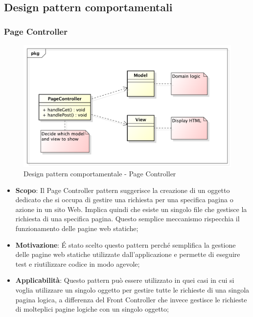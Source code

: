 
	\clearpage 
	\newpage
	\subsection{Design pattern comportamentali} %
		\subsubsection{Page Controller} %
		\begin{figure}[htbp]
			\centering
			\centerline{\includegraphics[scale=0.5]{./images/designpatternappendice/page_controller.pdf}}
			\caption{Design pattern comportamentale - Page Controller}
		\end{figure}

		\begin{itemize}
			\item \textbf{Scopo}: Il Page Controller pattern suggerisce la creazione di un oggetto dedicato che si occupa di gestire una richiesta per una specifica pagina o azione in un sito Web. Implica quindi che esiste un singolo file che gestisce la richiesta di una specifica pagina. Questo semplice meccanismo rispecchia il funzionamento delle pagine web statiche;
			\item \textbf{Motivazione}: \'E stato scelto questo pattern perché semplifica la gestione delle pagine web statiche utilizzate dall'applicazione e permette di eseguire test e riutilizzare codice in modo agevole;
			\item \textbf{Applicabilità}: Questo pattern può essere utilizzato in quei casi in cui si voglia utilizzare un singolo oggetto per gestire tutte le richieste di una singola pagina logica, a differenza del Front Controller che invece gestisce le richieste di molteplici pagine logiche con un singolo oggetto;
		\end{itemize}

